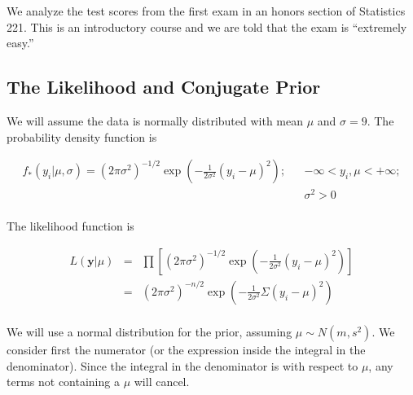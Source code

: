 \documentclass[12pt]{article}
\begin{document}
\noindent We analyze the test scores from the first exam in an honors section of Statistics 221.  This is an introductory course and we are told that the exam is ``extremely easy.''

\subsection{The Likelihood and Conjugate Prior}

\noindent We will assume the data is normally distributed with mean $\mu$ and $\sigma=9$.  The probability density function is

\begin{eqnarray*}
f_*(y_i|\mu,\sigma)=(2\pi\sigma^2)^{-1/2}\exp\left(-\frac{1}{2\sigma^2}(y_i-\mu)^2\right); && -\infty<y_i,\mu<+\infty; \\
&& \sigma^2>0 \\
\end{eqnarray*}

\noindent The likelihood function is

\begin{eqnarray*}
L(\mathbf{y}|\mu) &=& \prod\left[(2\pi\sigma^2)^{-1/2}\exp\left(-\frac{1}{2\sigma^2}(y_i-\mu)^2\right)\right] \\
&=& (2\pi\sigma^2)^{-n/2}\exp\left(-\frac{1}{2\sigma^2}\Sigma(y_i-\mu)^2\right) \\
\end{eqnarray*}

\noindent We will use a normal distribution for the prior, assuming $\mu\sim N(m,s^2)$. We consider first the numerator (or the expression inside the integral in the denominator). Since the integral in the denominator is with respect to $\mu$, any terms not containing a $\mu$ will cancel.
\end{document}
